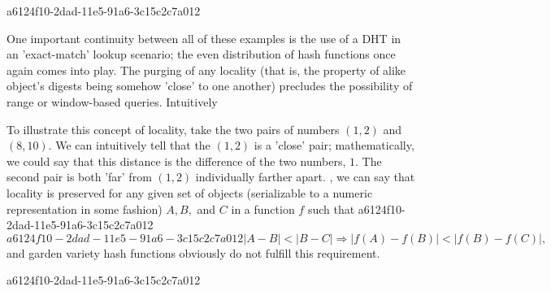 \documentclass[12pt]{article}
\begin{document}
a6124f10-2dad-11e5-91a6-3c15c2c7a012\par One important continuity between all of these examples is the use of a DHT in an 'exact-match' lookup scenario; the even distribution of hash functions once again comes into play. The purging of any locality (that is, the property of alike object's digests being somehow 'close' to one another) precludes the possibility of range or window-based queries. Intuitively

\par To illustrate this concept of locality, take the two pairs of numbers $(1,2)$ and $(8,10)$. We can intuitively tell that the $(1,2)$ is a 'close' pair; mathematically, we could say that this distance is the difference of the two numbers, $1$. The second pair is both 'far' from $(1,2)$ individually farther apart. , we can say that locality is preserved for any given set of objects (serializable to a numeric representation in some fashion) $A,B,$ and $C$ in a function $f$ such that
a6124f10-2dad-11e5-91a6-3c15c2c7a012\begin{equation}
a6124f10-2dad-11e5-91a6-3c15c2c7a012|A-B| < |B-C| \Rightarrow |f(A)-f(B)| < |f(B) - f(C)|,
\end{equation}
and garden variety hash functions obviously do not fulfill this requirement.

\printbibliography
a6124f10-2dad-11e5-91a6-3c15c2c7a012
\end{document}
